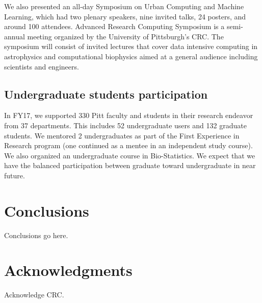 \documentclass[conference]{IEEEtran}
\begin{document}
We also presented an all-day Symposium on Urban Computing and Machine Learning, which had two plenary speakers, nine invited talks, 24 posters, and around 100 attendees. Advanced Research Computing Symposium is a semi-annual meeting organized by the University of Pittsburgh's CRC. The symposium will consist of invited lectures that cover data intensive computing in astrophysics and computational biophysics aimed at a general audience including scientists and engineers.




\subsection*{Undergraduate students participation}
In FY17, we supported 330 Pitt faculty and students in their research endeavor from 37 departments. This includes 52 undergraduate users and 132 graduate students. We mentored 2 undergraduates as part of the First Experience in Research program (one continued as a mentee in an independent study course). We also organized an undergraduate course in Bio-Statistics. We expect that we have the balanced participation between graduate toward undergraduate in near future.  


\section{Conclusions}

Conclusions go here.

\section{Acknowledgments}
Acknowledge CRC.
%

 
\end{document}
